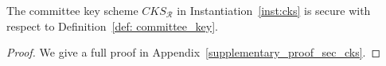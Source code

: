 \vspace{-0.07in}
\begin{theorem} 
The committee key scheme $\mathit{CKS}_{\mathcal{R}}$ in Instantiation~\ref{inst:cks} is secure with respect to Definition~\ref{def: committee_key}.
\end{theorem}
\vspace{-0.08in}
\begin{proof} We give a full proof in Appendix~\ref{supplementary_proof_sec_cks}. 
\end{proof}